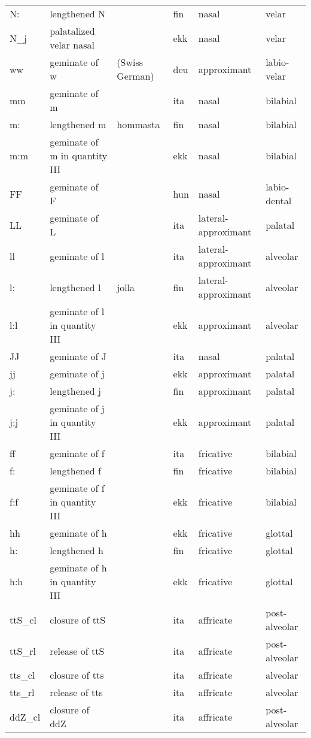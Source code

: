 {\begin{longtable}{l|p{.3\linewidth}|p{.15\linewidth}|l|p{.15\linewidth}|l}
	N:	& lengthened N	& 	& fin	& nasal	& velar	\\
	N\_j	& palatalized velar nasal	& 	& ekk	& nasal	& velar	\\
	ww	& geminate of w	& (Swiss German)	& deu	& approximant	& labio-velar	\\
	mm	& geminate of m	& 	& ita	& nasal	& bilabial	\\
	m:	& lengthened m	& hommasta	& fin	& nasal	& bilabial	\\
	m:m	& geminate of m in quantity III	& 	& ekk	& nasal	& bilabial	\\
	FF	& geminate of F	& 	& hun	& nasal	& labio-dental	\\
	LL	& geminate of L	& 	& ita	& lateral-approximant	& palatal	\\
	ll	& geminate of l	& 	& ita	& lateral-approximant	& alveolar	\\
	l:	& lengthened l	& jolla	& fin	& lateral-approximant	& alveolar	\\
	l:l	& geminate of l in quantity III	& 	& ekk	& approximant	& alveolar	\\
	JJ	& geminate of J	& 	& ita	& nasal	& palatal	\\
	jj	& geminate of j	& 	& ekk	& approximant	& palatal	\\
	j:	& lengthened j	& 	& fin	& approximant	& palatal	\\
	j:j	& geminate of j in quantity III	& 	& ekk	& approximant	& palatal	\\
	ff	& geminate of f	& 	& ita	& fricative	& bilabial	\\
	f:	& lengthened f	& 	& fin	& fricative	& bilabial	\\
	f:f	& geminate of f in quantity III	& 	& ekk	& fricative	& bilabial	\\
	hh	& geminate of h	& 	& ekk	& fricative	& glottal	\\
	h:	& lengthened h	& 	& fin	& fricative	& glottal	\\
	h:h	& geminate of h in quantity III	& 	& ekk	& fricative	& glottal	\\
	ttS\_cl	& closure of ttS	& 	& ita	& affricate	& post-alveolar	\\
	ttS\_rl	& release of ttS	& 	& ita	& affricate	& post-alveolar	\\
	tts\_cl	& closure of tts	& 	& ita	& affricate	& alveolar	\\
	tts\_rl	& release of tts	& 	& ita	& affricate	& alveolar	\\
	ddZ\_cl	& closure of ddZ	& 	& ita	& affricate	& post-alveolar	\\

\end{longtable}}
